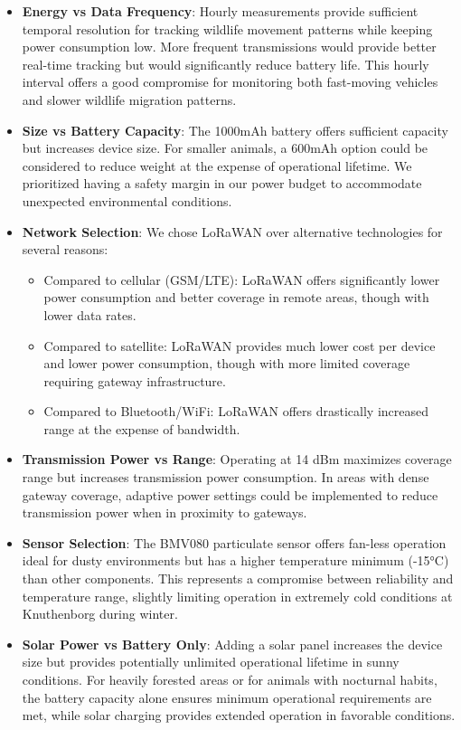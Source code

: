 \begin{itemize}
  \item \textbf{Energy vs Data Frequency}: Hourly measurements provide sufficient temporal resolution for tracking wildlife movement patterns while keeping power consumption low. More frequent transmissions would provide better real-time tracking but would significantly reduce battery life. This hourly interval offers a good compromise for monitoring both fast-moving vehicles and slower wildlife migration patterns.
  
  \item \textbf{Size vs Battery Capacity}: The 1000mAh battery offers sufficient capacity but increases device size. For smaller animals, a 600mAh option could be considered to reduce weight at the expense of operational lifetime. We prioritized having a safety margin in our power budget to accommodate unexpected environmental conditions.
  
  \item \textbf{Network Selection}: We chose LoRaWAN over alternative technologies for several reasons:
  \begin{itemize}
    \item Compared to cellular (GSM/LTE): LoRaWAN offers significantly lower power consumption and better coverage in remote areas, though with lower data rates.
    \item Compared to satellite: LoRaWAN provides much lower cost per device and lower power consumption, though with more limited coverage requiring gateway infrastructure.
    \item Compared to Bluetooth/WiFi: LoRaWAN offers drastically increased range at the expense of bandwidth.
  \end{itemize}
  
  \item \textbf{Transmission Power vs Range}: Operating at 14 dBm maximizes coverage range but increases transmission power consumption. In areas with dense gateway coverage, adaptive power settings could be implemented to reduce transmission power when in proximity to gateways.
  
  \item \textbf{Sensor Selection}: The BMV080 particulate sensor offers fan-less operation ideal for dusty environments but has a higher temperature minimum (-15°C) than other components. This represents a compromise between reliability and temperature range, slightly limiting operation in extremely cold conditions at Knuthenborg during winter.
  
  \item \textbf{Solar Power vs Battery Only}: Adding a solar panel increases the device size but provides potentially unlimited operational lifetime in sunny conditions. For heavily forested areas or for animals with nocturnal habits, the battery capacity alone ensures minimum operational requirements are met, while solar charging provides extended operation in favorable conditions.
\end{itemize}

